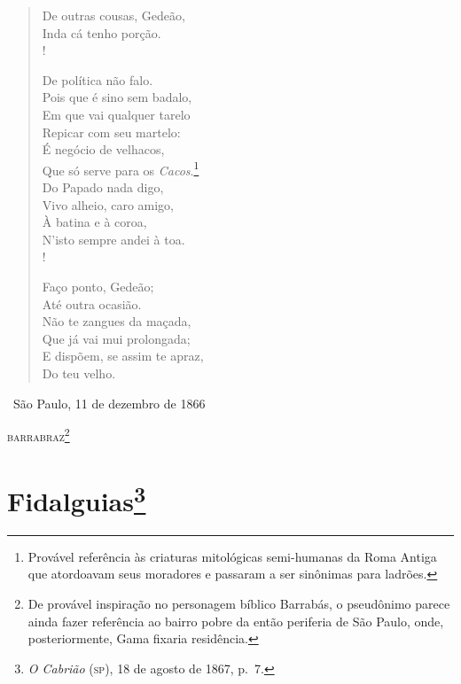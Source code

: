\begin{verse}
De outras cousas, Gedeão,\\
Inda cá tenho porção.\\!

De política não falo.\\
Pois que é sino sem badalo,\\
Em que vai qualquer tarelo\\
Repicar com seu martelo:\\
É negócio de velhacos,\\
Que só serve para os \emph{Cacos}.\footnote{ Provável referência às
                                criaturas mitológicas semi-humanas da Roma Antiga que atordoavam seus
                                moradores e passaram a ser sinônimas para ladrões.}\\
Do Papado nada digo,\\
Vivo alheio, caro amigo,\\
À batina e à coroa,\\
N'isto sempre andei à toa.\\!

Faço ponto, Gedeão;\\
Até outra ocasião.\\
Não te zangues da maçada,\\
Que já vai mui prolongada;\\
E dispõem, se assim te apraz,\\
Do teu velho.
\end{verse}\medskip

\hfill\ São Paulo, 11 de dezembro de 1866

\hfill\textsc{barrabraz}\footnote{ De provável inspiração no personagem bíblico
  Barrabás, o pseudônimo parece ainda fazer referência ao bairro pobre
  da então periferia de São Paulo, onde, posteriormente, Gama
  fixaria residência.}

\chapter{Fidalguias\footnote{\emph{O
  Cabrião} (\textsc{sp}), 18 de agosto de 1867, p.~7.}}

